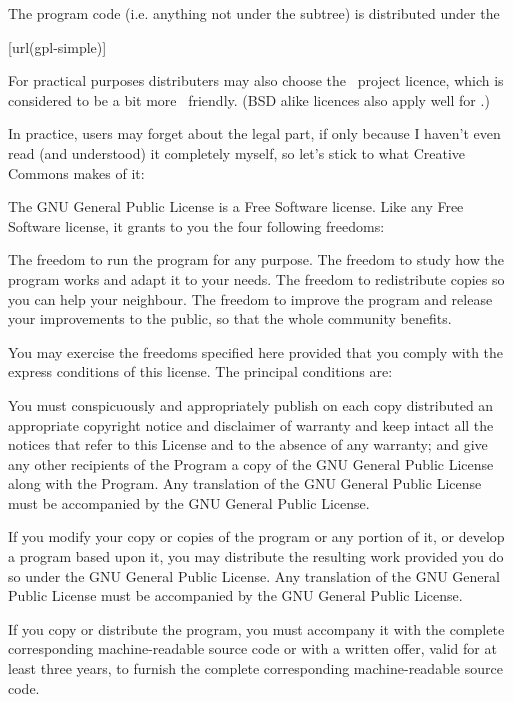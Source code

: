 \stopsubject

\startsubject[title={The Code}]

The program code (i.e. anything not under the  subtree) is
distributed under the

\startnarrower
{}[url(gpl-simple)]
\stopnarrower

For practical purposes distributers may also choose the \LATEX\ project licence,
which is considered to be a bit more \TEX\ friendly. (BSD alike licences also
apply well for \CONTEXT.)

In practice, users may forget about the legal part, if only because I haven't
even read (and understood) it completely myself, so let's stick to what Creative
Commons makes of it:

\startcolor[blue]
The GNU General Public License is a Free Software license. Like any Free Software
license, it grants to you the four following freedoms:

\startitemize
    \startitem
        The freedom to run the program for any purpose.
    \stopitem
    \startitem
        The freedom to study how the program works and adapt it to your needs.
    \stopitem
    \startitem
        The freedom to redistribute copies so you can help your neighbour.
    \stopitem
    \startitem
        The freedom to improve the program and release your improvements to the
        public, so that the whole community benefits.
    \stopitem
\stopitemize

You may exercise the freedoms specified here provided that you comply with the
express conditions of this license. The principal conditions are:

You must conspicuously and appropriately publish on each copy distributed an
appropriate copyright notice and disclaimer of warranty and keep intact all the
notices that refer to this License and to the absence of any warranty; and give
any other recipients of the Program a copy of the GNU General Public License
along with the Program. Any translation of the GNU General Public License must be
accompanied by the GNU General Public License.

If you modify your copy or copies of the program or any portion of it, or develop
a program based upon it, you may distribute the resulting work provided you do so
under the GNU General Public License. Any translation of the GNU General Public
License must be accompanied by the GNU General Public License.

If you copy or distribute the program, you must accompany it with the complete
corresponding machine-readable source code or with a written offer, valid for at
least three years, to furnish the complete corresponding machine-readable source
code.

